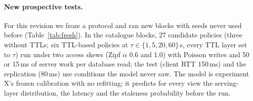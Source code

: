 \documentclass[acmsmall,review,nonacm]{acmart}
\begin{document}
\paragraph{New prospective tests.}
For this revision we froze a protocol and ran new blocks with seeds never used before (Table~\ref{tab:fresh}). In the catalogue blocks, 27 candidate policies (three without TTLs; six TTL-based policies at $\tau\in\{1,5,20,60\}$\,s, every TTL layer set to $\tau$) run under two access skews (Zipf $\alpha$ 0.6 and 1.0) with Poisson writes and 50 or 15\,ms of server work per database read; the test (client RTT 150\,ms) and the replication (80\,ms) use conditions the model never saw. The model is experiment X's frozen calibration with no refitting; it predicts for every view the serving-layer distribution, the latency and the staleness probability before the run.
\end{document}
